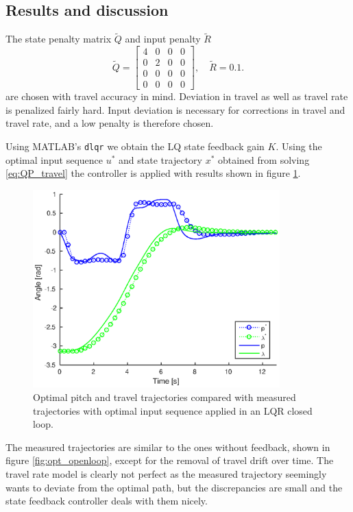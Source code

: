 \subsection{Results and discussion}

The state penalty matrix $\tilde{Q}$ and input penalty $\tilde{R}$
\begin{equation*}
\tilde{Q} = \begin{bmatrix}4&0&0&0\\0&2&0&0\\0&0&0&0\\0&0&0&0\end{bmatrix}, \quad \tilde{R} = 0.1.
\end{equation*}
are chosen with travel accuracy in mind. Deviation in travel as well as travel rate is penalized fairly hard. Input deviation is necessary for corrections in travel and travel rate, and a low penalty is therefore chosen.

Using MATLAB's \texttt{dlqr} we obtain the LQ state feedback gain $K$. Using the optimal input sequence $u^*$ and state trajectory $x^*$ obtained from solving \eqref{eq:QP_travel} the controller is applied with results shown in figure \ref{fig:lqr}.

\begin{figure}[h]
	\centering
		\includegraphics[width=0.85\textwidth]{figures/3/closedloop.eps}
	\caption{Optimal pitch and travel trajectories compared with measured trajectories with optimal input sequence applied in an LQR closed loop.}
	\label{fig:lqr}
\end{figure}


The measured trajectories are similar to the ones without feedback, shown in figure \ref{fig:opt_openloop}, except for the removal of travel drift over time. The travel rate model is clearly not perfect as the measured trajectory seemingly wants to deviate from the optimal path, but the discrepancies are small and the state feedback controller deals with them nicely.


